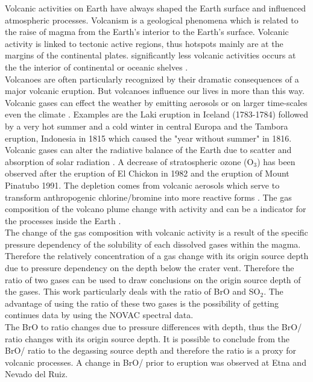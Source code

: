 
Volcanic activities on Earth have always shaped the Earth  surface and influenced atmospheric processes.
Volcanism is a geological phenomena which is related to the raise of magma  from the Earth's  interior to the Earth's  surface. Volcanic activity is linked to tectonic active regions, thus hotspots mainly are at the margins of the continental plates.
significantly less volcanic activities occurs at the the interior of continental or oceanic shelves \citep{schmincke2000vulkanismus}.\\
Volcanoes are often particularly recognized by their dramatic consequences of a major volcanic eruption. But volcanoes influence our lives in more than this way. Volcanic gases can effect the weather by emitting aerosols  or on larger time-scales even the climate \citep{schmidt2015volcanismarticle}. 
Examples are the Laki eruption in Iceland (1783-1784) followed by a very hot summer and a cold winter in central Europa \citep{thordarson2003atmospheric} and the Tambora eruption, Indonesia in 1815 which caused the "year without summer" in 1816.\\
Volcanic gases can alter the radiative balance of the Earth  due to scatter and absorption of solar radiation \citep{schmidt2015volcanism}.
A decrease of stratospheric ozone (O$_3$) has been observed after the eruption of  El Chickon in 1982 and the eruption of Mount Pinatubo 1991. The depletion comes from volcanic aerosols which serve to transform anthropogenic chlorine/bromine into more reactive forms \citep{solomon1998ozone}. 
%
\newline
%
The gas composition of the volcano plume change with activity and can be a indicator for the processes inside the Earth .\\ 
The change of the gas composition with volcanic activity is a result of the specific pressure dependency of the solubility of each dissolved gases within the magma. Therefore the relatively concentration of a gas change with its origin source depth due to pressure dependency on the depth below the crater vent. Therefore the ratio of two gases can be used to draw conclusions on the origin source depth of the gases.
%
This work particularly deals with the ratio of BrO and SO$_2$. The advantage of using the ratio of these two gases is the possibility of getting continues data by using the NOVAC spectral data.\\
The BrO to  ratio changes due to pressure differences with depth, thus the BrO/ ratio changes with its origin source depth. It is possible to conclude from the BrO/ ratio to the degassing source depth and therefore the ratio is a proxy for volcanic processes. A change in BrO/ prior to eruption was observed at Etna and Nevado del Ruiz.\\
